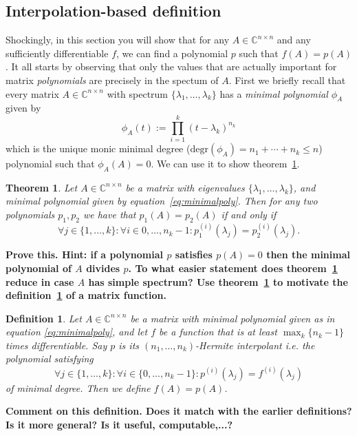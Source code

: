 \documentclass[12pt]{article}
\newtheorem{theorem}{Theorem}
\newtheorem{definition}{Definition}
\begin{document}
\subsection{Interpolation-based definition}
Shockingly, in this section you will show that for any $A\in \mathbb{C}^{ n\times n}$ and any sufficiently differentiable $f$, we can find a polynomial $p$ such that $f(A)=p(A)$. It all starts by observing that only the values that are actually important for matrix \emph{polynomials} are precisely in the spectum of $A$. First we briefly recall that every matrix $A\in \mathbb{C}^{n\times n}$ with spectrum $\{\lambda_1,\ldots,\lambda_k\}$ has a \emph{minimal polynomial $\phi_A$} given by
\begin{equation}\label{eq:minimalpoly}
\phi_A(t):=\prod_{i=1}^{k}(t-\lambda_k)^{n_k}
\end{equation}
which is the unique monic minimal degree ($\text{degr}(\phi_A)=n_1+\cdots+n_k\leq n$) polynomial such that $\phi_A(A)=0$. We can use it to show  theorem~\ref{thm:unicity}.
\begin{theorem}\label{thm:unicity}
Let $A\in \mathbb{C}^{n\times n}$ be a matrix with eigenvalues $\{\lambda_1,\ldots,\lambda_k\}$, and minimal polynomial given by equation~\ref{eq:minimalpoly}. Then for any two polynomials $p_1,p_2$ we have that $p_1(A)=p_2(A)$ if and only if 
$$\forall j\in\{1,\ldots,k\}:\forall i\in{0,\ldots,n_k-1}: p_1^{(i)}(\lambda_j)=p_2^{(i)}(\lambda_j).$$
\end{theorem}
\textbf{Prove this. Hint: if a polynomial $p$ satisfies $p(A)=0$ then the minimal polynomial of $A$ divides $p$. To what easier statement does theorem~\ref{thm:unicity} reduce in case $A$ has simple spectrum? Use theorem~\ref{thm:unicity} to motivate the definition~\ref{def:Hermite} of a matrix function.}
\begin{definition}\label{def:Hermite}
Let $A\in\mathbb{C}^{n\times n}$ be a matrix with minimal polynomial given as in equation \ref{eq:minimalpoly}, and let $f$ be a function that is at least $\max_k\{n_k-1\}$ times differentiable. Say $p$ is its $(n_1,\ldots,n_k)$-\emph{Hermite interpolant} i.e. the polynomial satisfying
$$\forall j\in\{1,\ldots,k\}:\forall i\in\{0,\ldots,n_k-1\}: p^{(i)}(\lambda_j)=f^{(i)}(\lambda_j)$$
of minimal degree. Then we define $f(A)=p(A)$.
\end{definition}
\textbf{Comment on this definition. Does it match with the earlier definitions? Is it more general? Is it useful, computable,...?}
\end{document}
